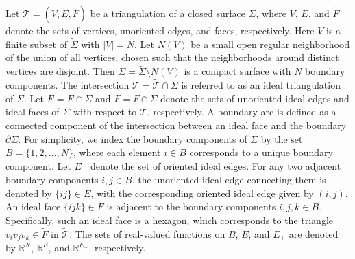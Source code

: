\documentclass[12pt]{amsart}
\theoremstyle{definition}
\begin{document}
Let $\widetilde{\mathcal{T}}=(V,\widetilde{E},\widetilde{F})$ be a triangulation of a closed surface $\widetilde{\Sigma}$, 
where $V$, $\widetilde{E}$, and $\widetilde{F}$ denote the sets of vertices, unoriented edges, and faces, respectively. 
Here $V$ is a finite subset of $\widetilde{\Sigma}$ with $|V|=N$. 
Let $N(V)$ be a small open regular neighborhood of the union of all vertices, chosen such that the neighborhoods around distinct vertices are disjoint. 
Then $\Sigma=\widetilde{\Sigma}\setminus N(V)$ is a compact surface with $N$ boundary components. 
The intersection $\mathcal{T}=\widetilde{\mathcal{T}}\cap \Sigma$ is referred to as an ideal triangulation of $\Sigma$. 
Let $E=\widetilde{E}\cap \Sigma$ and $F=\widetilde{F}\cap \Sigma$ denote the sets of unoriented ideal edges and ideal faces of $\Sigma$ with respect to $\mathcal{T}$, respectively. 
A boundary arc is defined as a connected component of the intersection between an ideal face and the boundary $\partial\Sigma$. 
For simplicity, we index the boundary components of $\Sigma$ by the set $B = \{1, 2, \dots, N\}$, where each element $i \in B$ corresponds to a unique boundary component. 
Let $E_+$ denote the set of oriented ideal edges. 
For any two adjacent boundary components $i, j \in B$, the unoriented ideal edge connecting them is denoted by $\{ij\} \in E$, with the corresponding oriented ideal edge given by $(i, j)$. 
An ideal face $\{ijk\} \in F$ is adjacent to the boundary components $i, j, k \in B$.
Specifically, such an ideal face is a hexagon, which corresponds to the triangle $v_iv_jv_k\in \widetilde{F}$ in $\widetilde{\mathcal{T}}$. 
The sets of real-valued functions on $B$, $E$, and $E_+$ are denoted by $\mathbb{R}^N$, $\mathbb{R}^E$, and $\mathbb{R}^{E_+}$, respectively.
\end{document}
